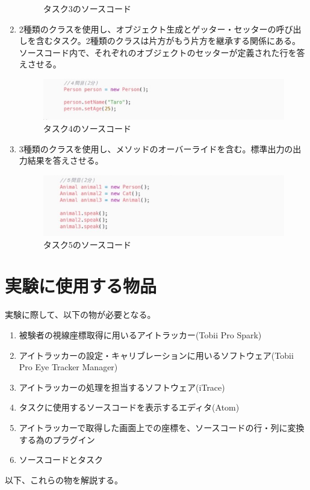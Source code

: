 \documentclass[paper=a4paper,fontsize=10pt]{jlreq}
\begin{document}
\begin{enumerate}[label=タスク\arabic*:]
\begin{figure}[h]
        \caption{タスク3のソースコード}
      \end{figure}
      \FloatBarrier
      \item 2種類のクラスを使用し、オブジェクト生成とゲッター・セッターの呼び出しを含むタスク。2種類のクラスは片方がもう片方を継承する関係にある。ソースコード内で、それぞれのオブジェクトのセッターが定義された行を答えさせる。
      \begin{figure}[h]
        \centering
        \includegraphics[height=0.2\linewidth]{プログラム画像_タスク4.jpg}
        \caption{タスク4のソースコード}
      \end{figure}
      \FloatBarrier
      \item 3種類のクラスを使用し、メソッドのオーバーライドを含む。標準出力の出力結果を答えさせる。
      \begin{figure}[h]
        \centering
        \includegraphics[height=0.25\linewidth]{プログラム画像_タスク5.jpg}
        \caption{タスク5のソースコード}
      \end{figure}
      \FloatBarrier
    \end{enumerate}

  

  \section{実験に使用する物品}
    実験に際して、以下の物が必要となる。
    \begin{enumerate}
      \item 被験者の視線座標取得に用いるアイトラッカー(Tobii Pro Spark)
      \item アイトラッカーの設定・キャリブレーションに用いるソフトウェア(Tobii Pro Eye Tracker Manager)
      \item アイトラッカーの処理を担当するソフトウェア(iTrace)
      \item タスクに使用するソースコードを表示するエディタ(Atom)
      \item アイトラッカーで取得した画面上での座標を、ソースコードの行・列に変換する為のプラグイン
      \item ソースコードとタスク
    \end{enumerate}
    以下、これらの物を解説する。
\end{document}
